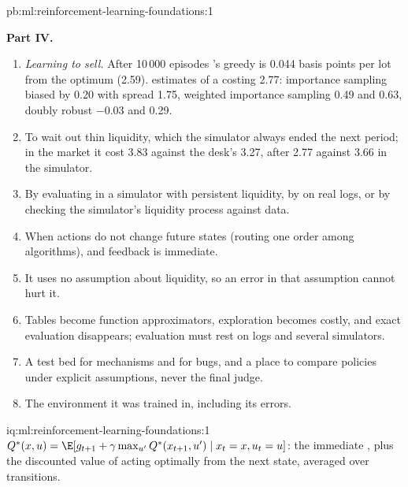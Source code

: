 \begin{solution}{pb:ml:reinforcement-learning-foundations:1}
\begin{enumerate}[resume]
\end{enumerate}
\textbf{Part IV.}
\begin{enumerate}[resume]
\item \emph{Learning to sell.} After 10\,000 episodes 's greedy  is 0.044 basis points per lot from the
optimum (2.59).  estimates of a  costing 2.77: importance sampling biased by 0.20 with spread 1.75, weighted
importance sampling 0.49 and 0.63, doubly robust $-0.03$ and 0.29.
\item To wait out thin liquidity, which the simulator always ended the next period; in the market it cost 3.83 against the
desk's 3.27, after 2.77 against 3.66 in the simulator.
\item By evaluating in a simulator with persistent liquidity, by  on real logs, or by checking the
simulator's liquidity process against data.
\item When actions do not change future states (routing one order among algorithms), and feedback is immediate.
\item It uses no assumption about liquidity, so an error in that assumption cannot hurt it.
\item Tables become function approximators, exploration becomes costly, and exact evaluation disappears; evaluation must
rest on logs and several simulators.
\item A test bed for mechanisms and for bugs, and a place to compare policies under explicit assumptions, never the final
judge.
\item The environment it was trained in, including its errors.
\end{enumerate}
\end{solution}

\begin{solution}{iq:ml:reinforcement-learning-foundations:1}
$Q^*(x, u) = \E[g_{t+1} + \gamma\max_{u'}Q^*(x_{t+1}, u')\mid x_t = x, u_t = u]$: the immediate , plus the discounted
value of acting optimally from the next state, averaged over transitions.
\end{solution}

